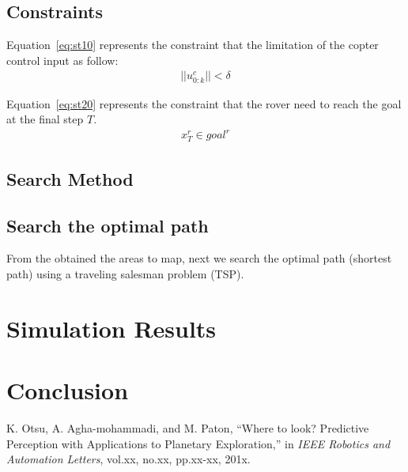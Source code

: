 \documentclass[conference]{IEEEtran}
\begin{document}
\subsection{Constraints}
Equation~\eqref{eq:st10} represents the constraint that the limitation of the copter control input as follow:
\begin{align}
    ||u^c_{0:k}||< \delta
\end{align}

Equation~\eqref{eq:st20} represents the constraint that the rover need to reach the goal at the final step $T$.
\begin{align}
    x^r_T \in goal^r
\end{align}

\subsection{Search Method}





\subsection{Search the optimal path}
From the obtained the areas to map, next we search the optimal path (shortest path) using a traveling salesman problem (TSP).



\section{Simulation Results}

\section{Conclusion}

\begin{thebibliography}{1}

K. Otsu, A. Agha-mohammadi, and M. Paton, ``Where to look? Predictive Perception with Applications to Planetary Exploration,'' in {\it IEEE Robotics and Automation Letters}, vol.xx, no.xx, pp.xx-xx, 201x.

\end{thebibliography}
\end{document}
